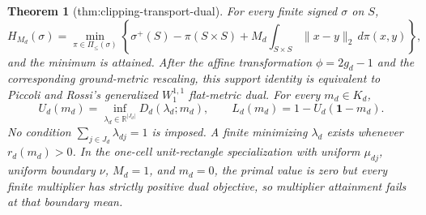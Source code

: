 \documentclass{article}
\newtheorem{theorem}{Theorem}
\begin{document}
\begin{theorem}[thm:clipping-transport-dual]\label{thm:clipping-transport-dual}
For every finite signed \(\sigma\) on \(S\), \[H_{M_d}(\sigma)=\min_{\pi\in\Pi_{\le}(\sigma)}\left\{\sigma^+(S)-\pi(S\times S)+M_d\int_{S\times S}\|x-y\|_2\,d\pi(x,y)\right\},\] and the minimum is attained. After the affine transformation \(\phi=2g_d-1\) and the corresponding ground-metric rescaling, this support identity is equivalent to Piccoli and Rossi's generalized \(W_1^{1,1}\) flat-metric dual. For every \(m_d\in K_d\), \[U_d(m_d)=\inf_{\lambda_d\in\mathbb R^{|J_d|}}D_d(\lambda_d;m_d),\qquad L_d(m_d)=1-U_d(\mathbf 1-m_d).\] No condition \(\sum_{j\in J_d}\lambda_{dj}=1\) is imposed. A finite minimizing \(\lambda_d\) exists whenever \(r_d(m_d)>0\). In the one-cell unit-rectangle specialization with uniform \(\mu_{dj}\), uniform boundary \(\nu\), \(M_d=1\), and \(m_d=0\), the primal value is zero but every finite multiplier has strictly positive dual objective, so multiplier attainment fails at that boundary mean.
\end{theorem}
\end{document}
